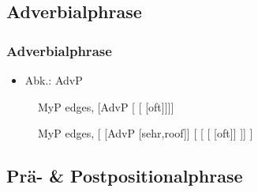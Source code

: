 \subsection{Adverbialphrase}

\begin{frame}
\frametitle{Adverbialphrase}

\begin{itemize}
	\item Abk.: AdvP
\end{itemize}

\begin{figure}[b]
	\begin{minipage}[b]{0.18\textwidth}
	\centering
	\footnotesize{
		\begin{forest}
		MyP edges,
		[AdvP [ []]]
		\end{forest}
		}
  	\end{minipage}  
  	\pause            
	\begin{minipage}[b]{0.03\textwidth}
	\hfill
  	\end{minipage}
	\begin{minipage}[b]{0.41\textwidth}
	\centering
	\footnotesize{
		\begin{forest}
		MyP edges,
		[ [AdvP [sehr,roof]]
			[\alertgreen{AdvP} 
		    [	[]
			]]
		]			 
		\end{forest}
		}
  	\end{minipage}
\end{figure}
\end{frame}


\subsection{Prä- \& Postpositionalphrase}

